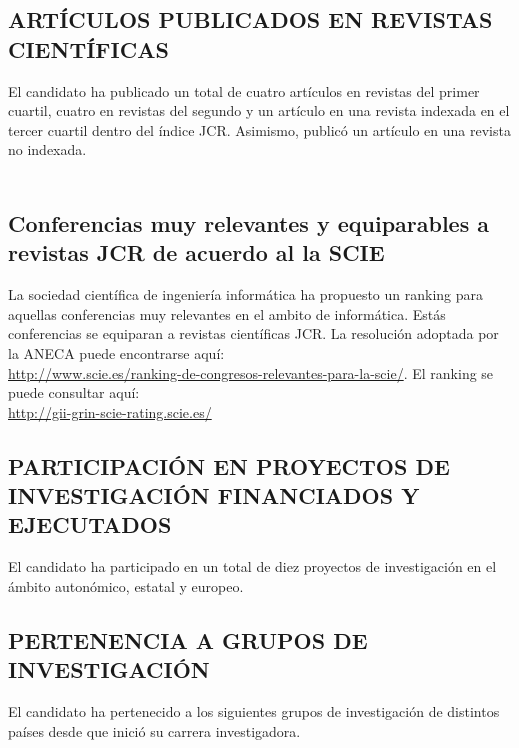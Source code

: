 \subsection{ARTÍCULOS PUBLICADOS EN REVISTAS CIENTÍFICAS}


El candidato ha publicado un total de cuatro artículos en revistas del primer cuartil, cuatro en revistas del segundo y un artículo en una revista indexada en el tercer cuartil dentro del índice JCR. Asimismo, publicó un artículo en una revista no indexada. \\
\startitems
{}
\stopitems 
\newpage
~
\newpage


\addtocounter{subsection}{-1}
\subsection{Conferencias muy relevantes y equiparables a revistas JCR de acuerdo al la SCIE} 
La sociedad científica de ingeniería informática ha propuesto un ranking para aquellas 
conferencias muy relevantes en el ambito de informática. Estás conferencias se equiparan a revistas científicas JCR. 
La resolución adoptada por la ANECA puede encontrarse aquí: \\
\url{http://www.scie.es/ranking-de-congresos-relevantes-para-la-scie/}.
El ranking se puede consultar aquí:\\
\url{http://gii-grin-scie-rating.scie.es/}

\startitems
{} 
\stopitems



\subsection{PARTICIPACIÓN EN PROYECTOS DE INVESTIGACIÓN FINANCIADOS Y EJECUTADOS}
\label{sec:motiv}
\label{sec:cybersecurity}
\label{sec:cyberdefense}

El candidato ha participado en un total de diez proyectos de investigación en el ámbito autonómico, estatal y europeo. \\
\startitems
\printProjects 
\stopitems 

\subsection{PERTENENCIA A GRUPOS DE INVESTIGACIÓN}
El candidato ha pertenecido a los siguientes grupos de investigación de distintos países desde que inició su carrera investigadora. \\
\startitems
\printGroups 
\stopitems
 
